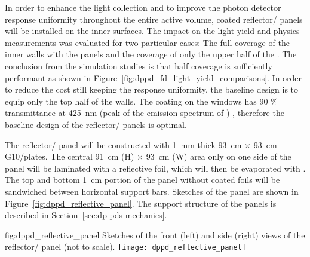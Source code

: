 In order to enhance the light collection and to improve the photon detector response uniformity throughout the entire  active volume,  coated reflector/ panels will be installed on the  inner surfaces. The impact on the light yield and physics measurements was evaluated for two particular cases: The full coverage of the  inner walls with the panels and the coverage of only the upper half of the . The conclusion from the simulation studies is that half coverage is sufficiently performant as shown in Figure~\ref{fig:dppd_fd_light_yield_comparisons}. In order to reduce the cost still keeping the  response uniformity, the baseline design is to equip only the top half of the  walls. The  coating on the  windows has \num{90} \% transmittance at \SI{425}{nm} (peak of the emission spectrum of ) \cite{Francini:2013lua}, therefore the baseline design of the reflector/ panels is optimal. 

The reflector/ panel will be constructed with \SI{1}{\mm} thick \SI{93}{\cm} $\times$ \SI{93}{\cm} G10/\frfour plates. The central \SI{91}{\cm} (H) $\times$ \SI{93}{\cm} (W) area only on one side of the panel will be laminated with a reflective foil, which will then be evaporated with . The top and bottom \SI{1}{\cm} portion of the panel without coated foils will be sandwiched between horizontal support bars. Sketches of the panel are shown in Figure~\ref{fig:dppd_reflective_panel}. The support structure of the panels is described in Section~\ref{sec:dp-pds-mechanics}. 
\begin{dunefigure}{fig:dppd_reflective_panel}
{Sketches of the front (left) and side (right) views of the reflector/ panel (not to scale).}
\texttt{[image: dppd\_reflective\_panel]}
\end{dunefigure}
